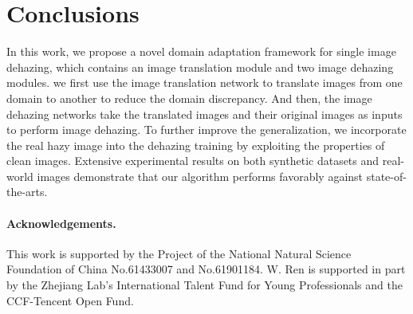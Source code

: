 \documentclass[10pt,twocolumn,letterpaper]{article}
\begin{document}
 
\section{Conclusions}
In this work, we propose a novel domain adaptation framework for single image dehazing, which contains an image translation module and two image dehazing modules.
we first use the image translation network to translate images from one domain to another to reduce the domain discrepancy. 
And then, the image dehazing networks take the translated images and their original images as inputs to perform image dehazing.
To further improve the generalization, we incorporate the real hazy image into the dehazing training by exploiting the properties of clean images. 
Extensive experimental results on both synthetic datasets and real-world images demonstrate that our algorithm performs favorably against state-of-the-arts.
\vspace{-4mm}
\paragraph{Acknowledgements.} 
This work is supported by the Project of the National Natural Science Foundation of China No.61433007 and No.61901184. W. Ren is supported in part by the Zhejiang Lab’s International Talent Fund for Young Professionals and the CCF-Tencent Open Fund.




{\small


}
\end{document}
